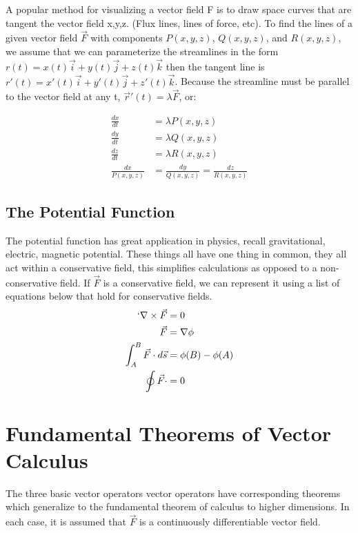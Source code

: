 \documentclass{book}
\begin{document}
A popular method for visualizing a vector field F is to draw space curves that are tangent the vector field x,y,z. (Flux lines, lines of force, etc). To find the lines of a given vector field \(\vec{F}\) with components \(P(x,y,z)\), \(Q(x,y,z)\), and \( R(x,y,z)\), we assume that we can parameterize the streamlines in the form \(r(t) = x(t) \vec{i} + y(t)\vec{j} + z(t) \vec{k}\) then the tangent line is \(r'(t) = x'(t) \vec{i} + y'(t)\vec{j} + z'(t) \vec{k}\). Because the streamline must be parallel to the vector field at any t, \(\vec{r}'(t) = \lambda \vec{F}\), or:

\begin{align*}
	\frac{dx}{dt} &= \lambda P (x,y,z) \\
	\frac{dy}{dt} &= \lambda Q (x,y,z) \\
	\frac{dz}{dt} &= \lambda R (x,y,z) \\
	\frac{dx}{P(x,y,z)} &= \frac{dy}{Q(x,y,z)} =  \frac{dz}{R(x,y,z)}
\end{align*} 


\subsection{The Potential Function}

The potential function has great application in physics, recall gravitational, electric, magnetic potential. These things all have one thing in common, they all act within a conservative field, this simplifies calculations as opposed to a non-conservative field. If \(\vec{F}\) is a conservative field, we can represent it using a list of equations below that hold for conservative fields.
\begin{align*}
	`\nabla \times \vec{F} &= 0 \\
	\vec{F} &= \nabla \phi \\
	\int_{A}^{B} \vec{F} \cdot d\vec{s} &= \phi(B) - \phi(A)  \\
	\oint \vec{F} \cdot &= 0 \\
\end{align*}

\section{Fundamental Theorems of Vector Calculus}

The three basic vector operators vector operators have corresponding theorems which generalize to the fundamental theorem of calculus to higher dimensions. In each case, it is assumed that $\vec{F}$ is a continuously differentiable vector field.
\end{document}
